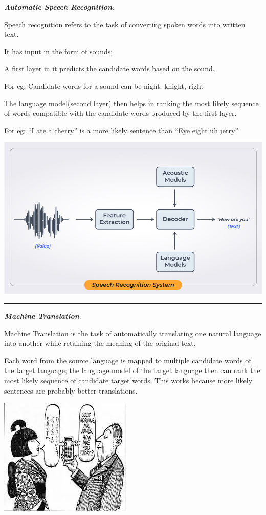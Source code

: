 \documentclass[11pt]{article}
\makeatletter
\def\maxwidth{\ifdim\Gin@nat@width>\linewidth\linewidth
    \else\Gin@nat@width\fi}
\let\Oldincludegraphics\includegraphics
\renewcommand{\includegraphics}[1]{\Oldincludegraphics[width=.8\maxwidth]{#1}}
\makeatother
\begin{document}
\textbf{\emph{Automatic Speech Recognition}}:

Speech recognition refers to the task of converting spoken words into
written text.

It has input in the form of sounds;

A first layer in it predicts the candidate words based on the sound.

For eg: Candidate words for a sound can be night, knight, right

The language model(second layer) then helps in ranking the most likely
sequence of words compatible with the candidate words produced by the
first layer.

For eg: ``I ate a cherry'' is a more likely sentence than ``Eye eight uh
jerry''

\includegraphics{spr.jpg}

\begin{center}\rule{0.5\linewidth}{\linethickness}\end{center}

\textbf{\emph{Machine Translation}}:

Machine Translation is the task of automatically translating one natural
language into another while retaining the meaning of the original text.

Each word from the source language is mapped to multiple candidate words
of the target language; the language model of the target language then
can rank the most likely sequence of candidate target words. This works
because more likely sentences are probably better translations.

\includegraphics{mt_2.jpg}
\end{document}
